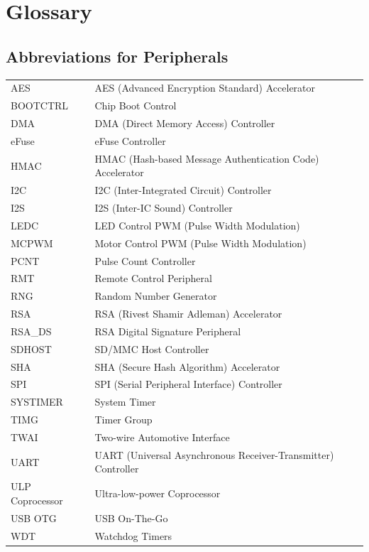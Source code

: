\section*{Glossary}\label{glossary}
\rhead{\Navigation}

\subsection*{Abbreviations for Peripherals}

\begin{longtable}[c]{ R{3cm} p{12cm} }

AES     & AES (Advanced Encryption Standard) Accelerator \\
BOOTCTRL & Chip Boot Control \\ 
DMA     & DMA (Direct Memory Access) Controller \\
eFuse   & eFuse Controller \\ 
HMAC    & HMAC (Hash-based Message Authentication Code) Accelerator \\ 
I2C     & I2C (Inter-Integrated Circuit) Controller \\ 
I2S     & I2S (Inter-IC Sound) Controller \\ 
LEDC    & LED Control PWM (Pulse Width Modulation)\\ 
MCPWM   & Motor Control PWM (Pulse Width Modulation) \\ 
PCNT & Pulse Count Controller \\
RMT     & Remote Control Peripheral \\
RNG     & Random Number Generator \\
RSA     & RSA (Rivest Shamir Adleman) Accelerator \\
RSA\_DS & RSA Digital Signature Peripheral \\
SDHOST  & SD/MMC Host Controller \\ 
SHA     & SHA (Secure Hash Algorithm) Accelerator \\
SPI     & SPI (Serial Peripheral Interface) Controller \\
SYSTIMER & System Timer \\ 
TIMG    & Timer Group \\
TWAI    & Two-wire Automotive Interface \\ 
UART    & UART (Universal Asynchronous Receiver-Transmitter) Controller \\ 
ULP Coprocessor & Ultra-low-power Coprocessor \\ 
USB OTG & USB On-The-Go \\ 
WDT & Watchdog Timers \\ 

\end{longtable}








